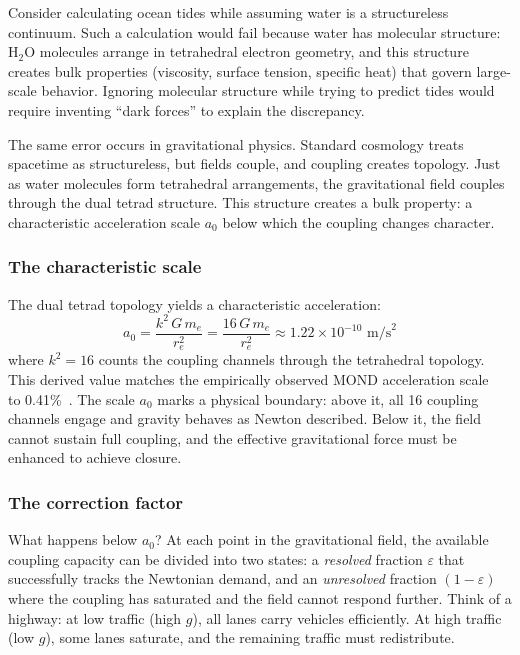\documentclass[aps,prd,preprint,superscriptaddress,showpacs,preprintnumbers,amsmath,amssymb,nofootinbib]{revtex4-2}
\begin{document}
Consider calculating ocean tides while assuming water is a structureless continuum. Such a calculation would fail because water has molecular structure: $\text{H}_2\text{O}$ molecules arrange in tetrahedral electron geometry, and this structure creates bulk properties (viscosity, surface tension, specific heat) that govern large-scale behavior. Ignoring molecular structure while trying to predict tides would require inventing ``dark forces'' to explain the discrepancy.

The same error occurs in gravitational physics. Standard cosmology treats spacetime as structureless, but fields couple, and coupling creates topology. Just as water molecules form tetrahedral arrangements, the gravitational field couples through the dual tetrad structure. This structure creates a bulk property: a characteristic acceleration scale $a_0$ below which the coupling changes character.

\subsubsection*{The characteristic scale}

The dual tetrad topology yields a characteristic acceleration:
\begin{equation}
a_0 = \frac{k^2 \, G \, m_e}{r_e^2} = \frac{16 \, G \, m_e}{r_e^2} \approx 1.22 \times 10^{-10} \text{ m/s}^2
\label{eq:a0-dm}
\end{equation}
where $k^2 = 16$ counts the coupling channels through the tetrahedral topology. This derived value matches the empirically observed MOND acceleration scale~\cite{milgrom1983} to 0.41\%~\cite{paper5}. The scale $a_0$ marks a physical boundary: above it, all 16 coupling channels engage and gravity behaves as Newton described. Below it, the field cannot sustain full coupling, and the effective gravitational force must be enhanced to achieve closure.

\subsubsection*{The correction factor}

What happens below $a_0$? At each point in the gravitational field, the available coupling capacity can be divided into two states: a \emph{resolved} fraction $\varepsilon$ that successfully tracks the Newtonian demand, and an \emph{unresolved} fraction $(1 - \varepsilon)$ where the coupling has saturated and the field cannot respond further. Think of a highway: at low traffic (high $g$), all lanes carry vehicles efficiently. At high traffic (low $g$), some lanes saturate, and the remaining traffic must redistribute.
\end{document}
